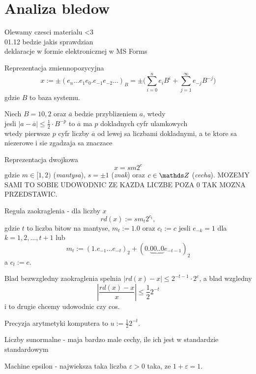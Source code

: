 \section{Analiza bledow}

Olewamy czesci materialu <3\\
01.12 bedzie jakis sprawdzian\\
deklaracje w formie elektronicznej w MS Forms
\bigskip

\begin{multicols}{2}

    {\color{def}Reprezentacja zmiennopozycyjna}
    $$x:=\pm(e_n...e_1e_0.e_{-1}e_{-2}...)_B = \pm\Big( \sum\limits_{i=0}^ne_iB^i+\sum\limits_{j=1}^\infty e_{-j}B^{-j} \Big)$$
    gdzie $B$ to baza systemu.
    \medskip

    Niech $B=10, 2$ oraz $\overline a$ bedzie przyblizeniem $a$, wtedy\smallskip\\
        \point jesli $|a-\overline{a}|\leq \frac12\cdot B^{-p}$ to $\overline a$ ma $p$ {\color{acc}dokladnych cyfr} ulamkowych\smallskip\\
        \point wtedy pierwsze $p$ cyfr liczby $\overline a$ od lewej sa liczbami dokladnymi, a te ktore sa niezerowe i sie zgadzaja sa {\color{acc}znaczace}
    \bigskip

    \bigskip

    {\color{def}Reprezentacja dwojkowa}
    $$x=sm2^c$$
    gdzie $m\in [1, 2)$ (\emph{mantysa}), $s=\pm 1$ (\emph{znak}) oraz $c\in\Z$ (\emph{cecha}). {\color{cyan}MOZEMY SAMI TO SOBIE UDOWODNIC ZE KAZDA LICZBE POZA 0 TAK MOZNA PRZEDSTAWIC}.
    \medskip

    {\color{def}Regula zaokraglenia} - dla liczby $x$
    $$rd(x):=sm_t 2^{c_t},$$
    gdzie $t$ to liczba bitow na mantyse, $m_t:=1.0$ oraz $c_t:=c$ jesli $e_{-k}=1$ dla $k=1, 2, ..., t+1$ lub
    $$m_t:= (1.e_{-1}...e_{-t})_2+(0.\underbrace{00..0}e_{-t-1})_2$$
    a $c_t:=c$.
    \bigskip

    Blad bezwzgledny zaokraglenia spelnia $|rd(x)-x|\leq 2^{-t-1}\cdot 2^c$, a blad wzgledny 
    $$|\frac{rd(x)-x}x|\leq \frac122^{-t}$$
    {\color{cyan}i to drugie chcemy udowodnic czy cos}.
    \medskip

    {\color{def}Precyzja arytmetyki} komputera to $u:=\frac122^{-t}$.

    {\color{def}Liczby sunormalne} - maja bardzo male cechy, {\color{cyan}ile ich jest w standardzie standardowym}

    {\color{acc}Machine epsilon} - najwieksza taka liczba $\varepsilon>0$ taka, ze $1+\varepsilon=1$.

\end{multicols}
